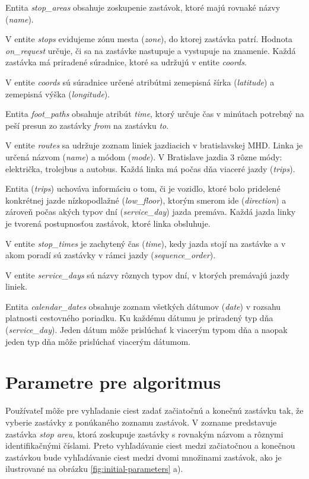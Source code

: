 Entita \textit{stop\_areas} obsahuje zoskupenie zastávok, ktoré majú rovnaké názvy (\textit{name}). 


V entite \textit{stops} evidujeme zónu mesta (\textit{zone}), do ktorej zastávka patrí. Hodnota \textit{on\_request} určuje, či sa na  zastávke nastupuje a vystupuje na znamenie. Každá zastávka má priradené súradnice, ktoré sa udržujú v entite \textit{coords}.

V entite \textit{coords} sú súradnice určené atribútmi zemepisná šírka (\textit{latitude}) a zemepisná výška (\textit{longitude}). 

Entita \textit{foot\_paths} obsahuje atribút \textit{time}, ktorý určuje čas v minútach potrebný na peší presun zo zastávky \textit{from} na zastávku \textit{to}.

V entite \textit{routes} sa udržuje zoznam liniek jazdiacich v bratislavskej MHD. Linka je určená názvom (\textit{name}) a módom (\textit{mode}). V Bratislave jazdia 3 rôzne módy: električka, trolejbus a autobus. Každá linka má počas dňa viaceré jazdy (\textit{trips}).

Entita (\textit{trips}) uchováva informáciu o tom, či je vozidlo, ktoré bolo pridelené konkrétnej jazde nízkopodlažné (\textit{low\_floor}), ktorým smerom ide (\textit{direction}) a zároveň počas akých typov dní (\textit{service\_day}) jazda premáva. Každá jazda linky je tvorená postupnosťou zastávok, ktoré linka obsluhuje.

V entite \textit{stop\_times} je zachytený čas (\textit{time}), kedy jazda stojí na zastávke a v akom poradí sú zastávky v rámci jazdy (\textit{sequence\_order}).

V entite \textit{service\_days} sú názvy rôznych typov dní, v ktorých premávajú jazdy liniek. 

Entita \textit{calendar\_dates} obsahuje zoznam všetkých dátumov (\textit{date}) v rozsahu platnosti cestovného poriadku. Ku každému dátumu je priradený typ dňa (\textit{service\_day}). Jeden dátum môže prislúchať k viacerým typom dňa a naopak jeden typ dňa môže prislúchať viacerým dátumom.


\section{Parametre pre algoritmus}
Používateľ môže pre vyhľadanie ciest zadať začiatočnú a konečnú zastávku tak, že vyberie zastávky z ponúkaného zoznamu zastávok. V zozname predstavuje zastávka \textit{stop areu}, ktorá zoskupuje zastávky s rovnakým názvom a rôznymi identifikačnými číslami. Preto vyhľadávanie ciest medzi začiatočnou a konečnou zastávkou bude vyhľadávanie ciest medzi  dvomi množinami zastávok, ako je ilustrované na obrázku \ref{fig:initial-parameters} a).

